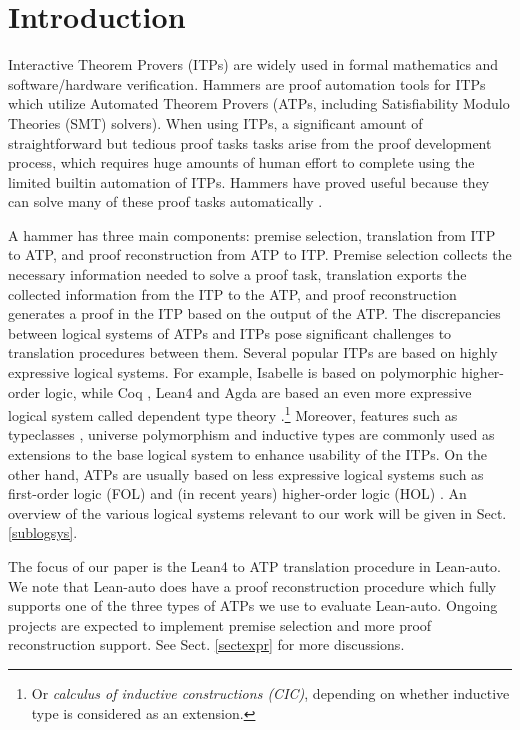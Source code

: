 \section{Introduction}

  Interactive Theorem Provers (ITPs) \cite{Harrison2014HistoryOI}
  are widely used in formal mathematics and software/hardware verification. Hammers
  \cite{Blanchette2016HammeringTQ,Czajka2018HammerFC} are proof automation tools for
  ITPs which utilize Automated Theorem Provers (ATPs, including Satisfiability Modulo Theories (SMT) solvers).
  When using ITPs, a significant amount of straightforward but tedious proof tasks
  tasks arise from the proof development process, which requires huge amounts of human
  effort to complete using the limited builtin automation of ITPs. Hammers have proved useful
  because they can solve many of these proof tasks automatically \cite{Paulson2012ThreeYO}.
  
  A hammer has three main components: premise selection, translation from ITP to
  ATP, and proof reconstruction from ATP to ITP. Premise selection collects
  the necessary information needed to solve a proof task, translation exports
  the collected information from the ITP to the ATP, and proof reconstruction generates
  a proof in the ITP based on the output of the ATP. The discrepancies between logical systems of ATPs and ITPs pose
  significant challenges to translation procedures between them.
  Several popular ITPs are based on highly expressive logical systems.
  For example, Isabelle \cite{Isabelle} is based on polymorphic higher-order logic, while
  Coq \cite{CoqRefMan}, Lean4 \cite{Lean4} and Agda \cite{Agda}
  are based an even more expressive logical system called dependent type
  theory \cite{LambdaWithType,Coquand1988}.\footnote{Or \textit{calculus of inductive constructions (CIC)}, depending
  on whether inductive type is considered as an extension.}
  Moreover, features such as typeclasses \cite{TypeClassHaskell}, universe polymorphism \cite{UPolyCoq} and inductive types \cite{CICIndDef}
  are commonly used as extensions to the base logical system to enhance usability of the ITPs.
  On the other hand, ATPs are usually based on less expressive logical systems such
  as first-order logic (FOL) \cite{CVC5,Vampire,Z3Paper,EProver} and (in recent years)
  higher-order logic (HOL) \cite{HOVampire,ZipperpositionMakeWork,HOEProver}.
  An overview of the various logical systems relevant to our work will be given in Sect. \ref{sublogsys}.

  The focus of our paper is the Lean4 to ATP translation procedure in Lean-auto.
  We note that Lean-auto does have a proof reconstruction procedure which fully supports
  one of the three types of ATPs we use to evaluate Lean-auto.
  Ongoing projects are expected to implement premise selection and more proof reconstruction support.
  See Sect. \ref{sectexpr} for more discussions.

